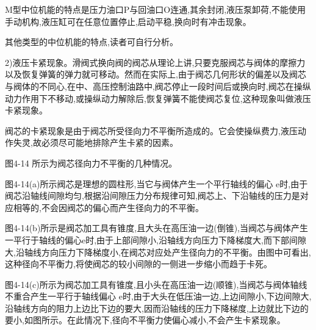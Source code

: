 M型中位机能的特点是压力油口P与回油口O连通,其余封闭,液压泵卸荷,不能使用手动机构,液压缸可在任意位置停止,启动平稳,换向时有冲击现象。

其他类型的中位机能的特点,读者可自行分析。

2)液压卡紧现象。滑阀式换向阀的阀芯从理论上讲,只要克服阀芯与阀体的摩擦力以及恢复弹簧的弹力就可移动。然而在实际上,由于阀芯几何形状的偏差以及阀芯与阀体的不同心,在中、高压控制油路中,阀芯停止一段时间后或换向时,阀芯在操纵动力作用下不移动,或操纵动力解除后,恢复弹簧不能使阀芯复位,这种现象叫做液压卡紧现象。

阀芯的卡紧现象是由于阀芯所受径向力不平衡所造成的。它会使操纵费力,液压动作失灵,故必须尽可能地排除产生卡紧的因素。

图4-14 所示为阀芯径向力不平衡的几种情况。

图4-14(a)所示阀芯是理想的圆柱形,当它与阀体产生一个平行轴线的偏心 e时,由于阀芯沿轴线间隙均匀,根据沿间隙压力分布规律可知,阀芯上、下沿轴线的压力是对应相等的,不会因阀芯的偏心而产生径向力的不平衡。

图4-14(b)所示是阀芯加工具有锥度,且大头在高压油一边(倒锥),当阀芯与阀体产生一平行于轴线的偏心e时,由于上部间隙小,沿轴线方向压力下降梯度大,而下部间隙大,沿轴线方向压力下降梯度小,在阀芯对应处产生径向力的不平衡。由图中可看出,这种径向不平衡力,将使阀芯的较小间隙的一侧进一步缩小而趋于卡死。

图4-14(c)所示为阀芯加工具有锥度,且小头在高压油一边(顺锥),当阀芯与阀体轴线不重合产生一平行于轴线偏心 e时,由于大头在低压油一边,上边间隙小,下边间隙大,沿轴线方向的阻力上边比下边的要大,因而沿轴线的压力下降梯度,上边就比下边的要小,如图所示。在此情况下,径向不平衡力使偏心减小,不会产生卡紧现象。

